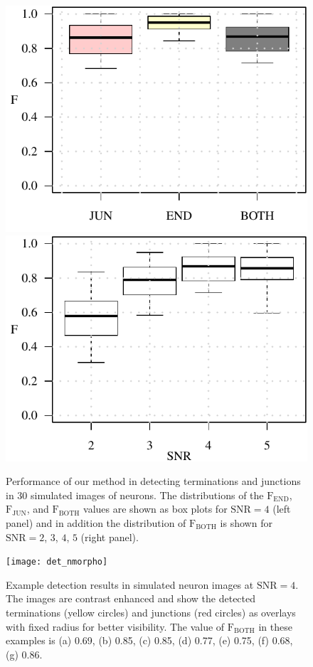 \begin{figure}[!t]
	\centering
	\includegraphics[width=0.48\linewidth]{nmorpho_snr4}%
	\includegraphics[width=0.48\linewidth]{nmorpho_snr}
	\caption{Performance of our method in detecting terminations and junctions in 30 simulated images of neurons. The distributions of the $\textrm{F}_\textrm{END}$, $\textrm{F}_\textrm{JUN}$, and $\textrm{F}_\textrm{BOTH}$ values are shown as box plots for $\textrm{SNR}=4$ (left panel) and in addition the distribution of $\textrm{F}_\textrm{BOTH}$ is shown for $\textrm{SNR}=2$, $3$, $4$, $5$ (right panel).}
	\label{fig:results-sim}
\end{figure}


\begin{figure}[!t]
	\centering
	\texttt{[image: det\_nmorpho]}
	\caption{Example detection results in simulated neuron images at $\textrm{SNR}=4$. The images are contrast enhanced and show the detected terminations (yellow circles) and junctions (red circles) as overlays with fixed radius for better visibility. The value of $\textrm{F}_\textrm{BOTH}$ in these examples is (a) 0.69, (b) 0.85, (c) 0.85, (d) 0.77, (e) 0.75, (f) 0.68, (g) 0.86.}
	\label{fig:nmorpho-det}
\end{figure}

